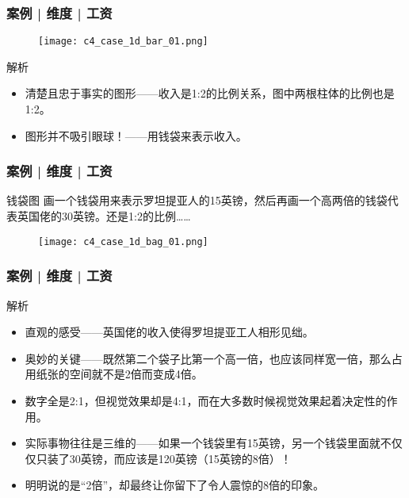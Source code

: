 \begin{frame}
  \frametitle{案例 | 维度 | 工资}
  \begin{figure}
    \centering
    \texttt{[image: c4\_case\_1d\_bar\_01.png]}
  \end{figure}
  \vspace{-1em}
  \begin{block}{解析}
    \begin{itemize}
      \item 清楚且忠于事实的图形——收入是1:2的比例关系，图中两根柱体的比例也是1:2。
      \item 图形并不吸引眼球！——用钱袋来表示收入。
    \end{itemize}
  \end{block}
\end{frame}

\begin{frame}
  \frametitle{案例 | 维度 | 工资}
  \begin{block}{钱袋图}
    画一个钱袋用来表示罗坦提亚人的15英镑，然后再画一个高两倍的钱袋代表英国佬的30英镑。还是1:2的比例……
  \end{block}
  \vspace{-0.5em}
  \begin{figure}
    \centering
    \texttt{[image: c4\_case\_1d\_bag\_01.png]}
  \end{figure}
\end{frame}

\begin{frame}
  \frametitle{案例 | 维度 | 工资}
  \begin{block}{解析}
    \begin{itemize}
      \item 直观的感受——英国佬的收入使得罗坦提亚工人相形见绌。
      \item 奥妙的关键——既然第二个袋子比第一个高一倍，也应该同样宽一倍，那么占用纸张的空间就不是2倍而变成4倍。
      \item 数字全是2:1，但视觉效果却是4:1，而在大多数时候视觉效果起着决定性的作用。
      \item 实际事物往往是三维的——如果一个钱袋里有15英镑，另一个钱袋里面就不仅仅只装了30英镑，而应该是120英镑（15英镑的8倍）！
      \item 明明说的是“2倍”，却最终让你留下了令人震惊的8倍的印象。
    \end{itemize}
  \end{block}
\end{frame}


